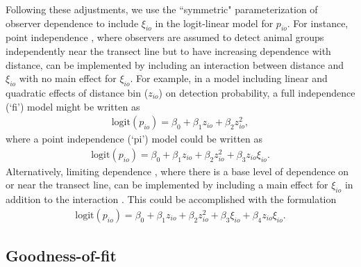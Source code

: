 \documentclass[aoas,preprint]{imsart}
\numberwithin{equation}{section}
\theoremstyle{plain}
\begin{document}
Following these adjustments, we use the ``symmetric" parameterization \citep{MacKenzieClement2016} of observer dependence to include $\xi_{io}$ in the logit-linear model for $p_{io}$.  For instance, point independence \citep{LaakeBorchers2004,BucklandEtAl2010}, where observers are assumed to detect animal groups independently near the transect line but to have increasing dependence with distance, can be implemented by including an interaction between distance and $\xi_{io}$ with no main effect for $\xi_{io}$.  For example, in a model including linear and quadratic effects of distance bin ($z_{io}$) on detection probability, a full independence (`fi') model might be written as
\begin{eqnarray*}
  \text{logit}(p_{io})=\beta_0 + \beta_1 z_{io} + \beta_2 z_{io}^2,
\end{eqnarray*}
where a point independence (`pi') model could be written as
\begin{eqnarray*}
  \text{logit}(p_{io})=\beta_0 + \beta_1 z_{io} + \beta_2 z_{io}^2 + \beta_3 z_{io} \xi_{io}.
  \label{eq:pi_ex}
\end{eqnarray*}
Alternatively, limiting dependence \citep[`li'][]{BucklandEtAl2010}, where there is a base level of dependence on or near the transect line, can be implemented by including a main effect for $\xi_{io}$ in addition to the interaction \citep{MacKenzieClement2016}.  This could be accomplished with the formulation
\begin{eqnarray*}
  \text{logit}(p_{io})=\beta_0 + \beta_1 z_{io} + \beta_2 z_{io}^2 + \beta_3 \xi_{io} + \beta_4 z_{io} \xi_{io}.
\end{eqnarray*}

\subsection{Goodness-of-fit}
\end{document}
